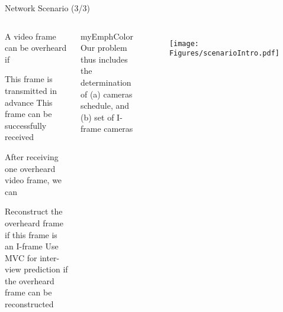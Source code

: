 \begin{frame}{Network Scenario (3/3)}
\begin{columns}
	\begin{itemize}
		\myItem A video frame can be overheard if
		\begin{itemize}
			\mySubItem This frame is transmitted in advance
			\mySubItem This frame can be successfully received
		\end{itemize}
		\myItem After receiving one overheard video frame, we can
		\begin{itemize}
			\mySubItem Reconstruct the overheard frame if this frame is an I-frame
			\mySubItem Use MVC for inter-view prediction if the overheard frame can be reconstructed
		\end{itemize}
	\end{itemize}
	\begin{beamercolorbox}[center,shadow=true,rounded=true]{myEmphColor}
	Our problem thus includes the determination of (a) cameras schedule, and \\ (b) set of I-frame cameras
	\end{beamercolorbox}
 
	\begin{figure}
	\centering
	\texttt{[image: Figures/scenarioIntro.pdf]}
	\end{figure}
\end{columns}
\end{frame}